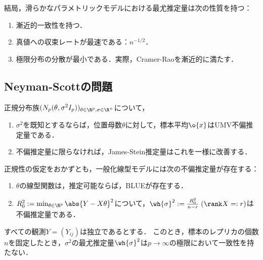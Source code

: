 \documentclass[uplatex,dvipdfmx]{jsreport}
\begin{document}
\begin{tcolorbox}[colframe=ForestGreen, colback=ForestGreen!10!white,breakable,colbacktitle=ForestGreen!40!white,coltitle=black,fonttitle=\bfseries\sffamily,
title=]
    結局，滑らかなパラメトリックモデルにおける最尤推定量は次の性質を持つ：
    \begin{enumerate}
        \item 漸近的一致性を持つ．
        \item 真値への収束レートが最速である：$n^{-1/2}$．
        \item 極限分布の分散が最小である．実際，Cramer-Raoを漸近的に満たす．
    \end{enumerate}
\end{tcolorbox}

\subsection{Neyman-Scottの問題}

\begin{tcolorbox}[colframe=ForestGreen, colback=ForestGreen!10!white,breakable,colbacktitle=ForestGreen!40!white,coltitle=black,fonttitle=\bfseries\sffamily,
title=]
    正規分布族$(N_p(\theta,\sigma^2I_p))_{\theta\in\R^p,\sigma\in\R^+}$について，
    \begin{enumerate}
        \item $\sigma^2$を既知とするならば，位置母数$\theta$に対して，標本平均$\o{x}$はUMV不偏推定量である．
        \item 不偏推定量に限らなければ，James-Stein推定量はこれを一様に改善する．
    \end{enumerate}
    正規性の仮定をおかずとも，一般化線型モデルには次の不偏推定量が存在する：
    \begin{enumerate}
        \item $\theta$の線型関数は，推定可能ならば，BLUEが存在する．
        \item $R^2_0:=\min_{\theta\in\R^p}\abs{Y-X\theta}^2$について，$\wh{\sigma}^2:=\frac{R^2_0}{n-r}\;(\rank X=:r)$は不偏推定量である．
    \end{enumerate}
\end{tcolorbox}

\begin{theorem}
    すべての観測$Y=(Y_{ij})$は独立であるとする．
    このとき，標本のレプリカの個数$n$を固定したとき，$\sigma^2$の最尤推定量$\wh{\sigma}^2$は$p\to\infty$の極限において一致性を持たない．
\end{theorem}
\end{document}
